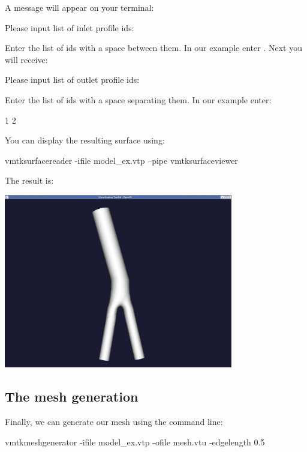 A message will appear on your terminal\+: 
\begin{DoxyCode}
Please input list of inlet profile ids:
\end{DoxyCode}


Enter the list of ids with a space between them. In our example enter {} . Next you will receive\+: 
\begin{DoxyCode}
Please input list of outlet profile ids:
\end{DoxyCode}


Enter the list of ids with a space separating them. In our example enter\+: 
\begin{DoxyCode}
1 2
\end{DoxyCode}


You can display the resulting surface using\+: 
\begin{DoxyCode}
vmtksurfacereader -ifile model\_ex.vtp --pipe vmtksurfaceviewer
\end{DoxyCode}


The result is\+:

 
\begin{DoxyImageNoCaption}
  \mbox{\includegraphics[width=0.75\textwidth]{extenstion_display}}
\end{DoxyImageNoCaption}




 

\hypertarget{index_vmtk_mesh}{}\subsection{The mesh generation}\label{index_vmtk_mesh}
Finally, we can generate our mesh using the command line\+: 
\begin{DoxyCode}
vmtkmeshgenerator -ifile model\_ex.vtp -ofile mesh.vtu -edgelength 0.5
\end{DoxyCode}


